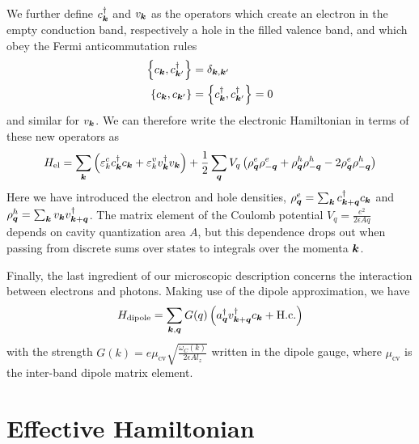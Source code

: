 We further define $c_{\bm{k}}^{\dagger}$ and $v_{\bm{k}}$ as the operators which
create an electron in the empty conduction band, respectively a hole
in the filled valence band, and which obey the Fermi anticommutation
rules
\begin{align}
  \left\{c_{\bm{k}}, c_{\bm{k}^{\prime}}^{\dagger}\right\} & =\delta_{\bm{k},\bm{k}^{\prime}}\\
  \left\{c_{\bm{k}}, c_{\bm{k}^{\prime}}\right\} & = \left\{c_{\bm{k}}^{\dagger}, c_{\bm{k}^{\prime}}^{\dagger}\right\} = 0
\end{align}
and similar for $v_{\bm{k}}$. We can therefore write the electronic
Hamiltonian in terms of these new operators
as~\cite{yamamoto1999mesoscopic}
%
\begin{equation}\label{eq:coulomb-hamiltonian}
  H_{\text{el}} = \sum_{\bm{k}} \left( \varepsilon^c_k c_{\bm{k}}^{\dagger} c_{\bm{k}} + \varepsilon^v_k v_{\bm{k}}^{\dagger} v_{\bm{k}} \right) + \frac{1}{2}\sum_{\bm{q}} V_q \left( \rho^e_{\bm{q}} \rho^e_{-\bm{q}} + \rho^h_{\bm{q}} \rho^h_{-\bm{q}} -2 \rho^e_{\bm{q}} \rho^h_{-\bm{q}}\right)
\end{equation}
% 
Here we have introduced the electron and hole densities,
$\rho^e_{\bm{q}} = \sum_{\bm{k}} c_{\bm{k} + \bm{q}}^{\dagger} c_{\bm{k}}$ and
$\rho^h_{\bm{q}} = \sum_{\bm{k}} v_{\bm{k}} v_{\bm{k} + \bm{q}}^{\dagger}$. The
matrix element of the Coulomb potential
$V_q = \frac{e^2}{2 \epsilon A q}$ depends on cavity quantization area
$A$, but this dependence drops out when passing from discrete sums
over states to integrals over the momenta $\bm{k}$.

Finally, the last ingredient of our microscopic description concerns
the interaction between electrons and photons. Making use of the
dipole approximation, we have
%
\begin{equation}\label{eq:dipolar-inter}
  H_{\text{dipole}} = \sum_{\bm{k}, \bm{q}} G(q) \left( a_{\bm{q}}^{\dagger} v_{\bm{k} + \bm{q}}^{\dagger} c_{\bm{k}} + \text{H.c.}\right)
\end{equation}
% 
with the strength
$G(k) = e \mu_{\text{cv}}\sqrt{\frac{\omega_C(k)}{2\epsilon A l_z}}$
written in the dipole gauge, where $\mu_{\text{cv}}$ is the inter-band
dipole matrix element.


\section{Effective Hamiltonian}
\label{sec:effective}


